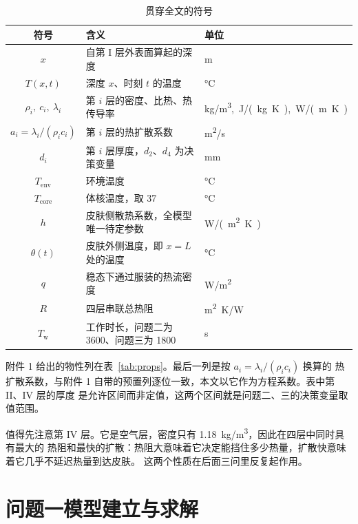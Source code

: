 \documentclass[withoutpreface,bwprint]{cumcmthesis}
\begin{document}
\begin{table}[htbp]
  \centering
  \caption{贯穿全文的符号}
  \label{tab:symbols}
  \begin{tabular}{cll}
    \toprule
    符号 & 含义 & 单位 \\
    \midrule
    $x$ & 自第 I 层外表面算起的深度 & \si{m} \\
    $T(x,t)$ & 深度 $x$、时刻 $t$ 的温度 & \si{\celsius} \\
    $\rho_i,\ c_i,\ \lambda_i$ & 第 $i$ 层的密度、比热、热传导率 & \si{kg/m^3},\ \si{J/(kg.K)},\ \si{W/(m.K)} \\
    $a_i=\lambda_i/(\rho_i c_i)$ & 第 $i$ 层的热扩散系数 & \si{m^2/s} \\
    $d_i$ & 第 $i$ 层厚度，$d_2$、$d_4$ 为决策变量 & \si{mm} \\
    $T_{\mathrm{env}}$ & 环境温度 & \si{\celsius} \\
    $T_{\mathrm{core}}$ & 体核温度，取 \num{37} & \si{\celsius} \\
    $h$ & 皮肤侧散热系数，全模型唯一待定参数 & \si{W/(m^2.K)} \\
    $\theta(t)$ & 皮肤外侧温度，即 $x=L$ 处的温度 & \si{\celsius} \\
    $q$ & 稳态下通过服装的热流密度 & \si{W/m^2} \\
    $R$ & 四层串联总热阻 & \si{m^2.K/W} \\
    $T_{\mathrm{w}}$ & 工作时长，问题二为 \num{3600}、问题三为 \num{1800} & \si{s} \\
    \bottomrule
  \end{tabular}
\end{table}

附件 1 给出的物性列在表~\ref{tab:props}。最后一列是按 $a_i=\lambda_i/(\rho_i c_i)$ 换算的
热扩散系数，与附件 1 自带的预置列逐位一致，本文以它作为方程系数。表中第 II、IV 层的厚度
是允许区间而非定值，这两个区间就是问题二、三的决策变量取值范围。

\begin{table}[htbp]
  \centering
  \caption{附件 1 的四层物性与换算所得热扩散系数}
  \label{tab:props}
  
\end{table}

值得先注意第 IV 层。它是空气层，密度只有 \SI{1.18}{kg/m^3}，因此在四层中同时具有最大的
热阻和最快的扩散：热阻大意味着它决定能挡住多少热量，扩散快意味着它几乎不延迟热量到达皮肤。
这两个性质在后面三问里反复起作用。

\section{问题一模型建立与求解}
\label{mcm-q1-start}
\end{document}
